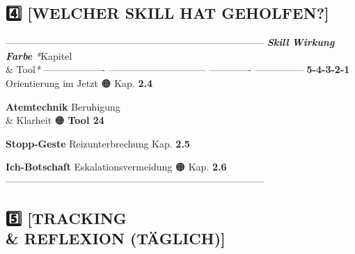 {\subsection{4️⃣ \textbf{[WELCHER SKILL HAT GEHOLFEN?]}}

--------------------------------------------------------------------------------
\textbf{\textit{Skill}}         \textbf{\textit{Wirkung}}                  \textbf{\textit{Farbe}}   \textit{*}Kapitel \\&
Tool\textit{*}
------------------- ------------------------------ ------------- ---------------
\textbf{5-4-3-2-1}       Orientierung im Jetzt          🟠            Kap. \textbf{2.4}

\textbf{Atemtechnik}     Beruhigung \\& Klarheit          🟠            \textbf{Tool 24}

\textbf{Stopp-Geste}     Reizunterbrechung              \textcolor{ctmmRed}{}            Kap. \textbf{2.5}

\textbf{Ich-Botschaft}   Eskalationsvermeidung          🟠            Kap. \textbf{2.6}
--------------------------------------------------------------------------------

\subsection{5️⃣ \textbf{[TRACKING \\& REFLEXION (TÄGLICH)]}}

}
